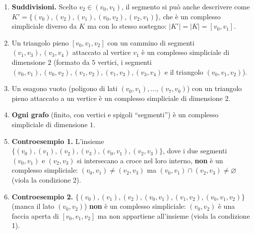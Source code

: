 \begin{ejemplo}
\begin{enumerate}
    \item \textbf{Suddivisioni.} Scelto $v_2 \in (v_0, v_1)$, il segmento si pu\`o anche descrivere come $K' = \{ (v_0), (v_2), (v_1), (v_0, v_2), (v_2, v_1) \}$, che \`e un complesso simpliciale diverso da $K$ ma con lo stesso sostegno: $|K'| = |K| = [v_0, v_1]$.
    \item Un triangolo pieno $[v_0, v_1, v_2]$ con un cammino di segmenti $(v_1, v_3), (v_3, v_4)$ attaccato al vertice $v_1$ \`e un complesso simpliciale di dimensione $2$ (formato da $5$ vertici, i segmenti $(v_0,v_1), (v_0, v_2), (v_1, v_2), (v_1, v_3), (v_3, v_4)$ e il triangolo $(v_0, v_1, v_2)$).
    \item Un esagono vuoto (poligono di lati $(v_0,v_1), \dots, (v_7, v_0)$) con un triangolo pieno attaccato a un vertice \`e un complesso simpliciale di dimensione $2$.
    \item \textbf{Ogni grafo} (finito, con vertici e spigoli ``segmenti'') \`e un complesso simpliciale di dimensione $1$.
    \item \textbf{Controesempio 1.} L'insieme $\{ (v_0), (v_1), (v_2), (v_3), (v_0, v_1), (v_2, v_3) \}$, dove i due segmenti $(v_0,v_1)$ e $(v_2,v_3)$ si intersecano a croce nel loro interno, \textbf{non} \`e un complesso simpliciale: $(v_0, v_1) \neq (v_2, v_3)$ ma $(v_0, v_1) \cap (v_2, v_3) \neq \varnothing$ (viola la condizione 2).
    \item \textbf{Controesempio 2.} $\{ (v_0), (v_1), (v_2), (v_0, v_1), (v_1, v_2), (v_0, v_1, v_2) \}$ (manca il lato $(v_0, v_2)$) \textbf{non} \`e un complesso simpliciale: $(v_0, v_2)$ \`e una faccia aperta di $[v_0, v_1, v_2]$ ma non appartiene all'insieme (viola la condizione 1).
\end{enumerate}
\end{ejemplo}

